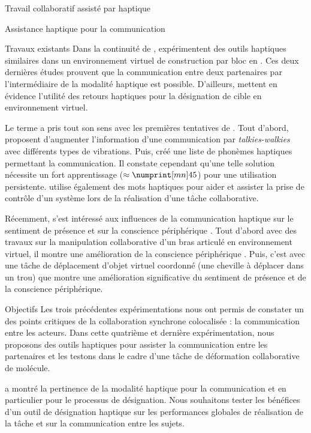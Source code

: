\documentclass[myfrancais,ngerman,english,frenchb]{mythesis}
\begin{document}
\begin{mychapter}{Travail collaboratif assisté par haptique}
\begin{mysection}{Assistance haptique pour la communication}
\begin{mysubsection}{Travaux existants}
				Dans la continuité de ,  expérimentent des outils haptiques similaires dans un environnement virtuel de construction par bloc en \myThreeD.
				Ces deux dernières études prouvent que la communication entre deux partenaires par l'intermédiaire de la modalité haptique est possible.
				D'ailleurs,  mettent en évidence l'utilité des retours haptiques pour la désignation de cible en environnement virtuel.

				Le terme  a pris tout son sens avec les premières tentatives de .
				Tout d'abord,  proposent d'augmenter l'information d'une communication par \textit{talkies-walkies} avec différents types de vibrations.
				Puis,  créé une liste de phonèmes haptiques permettant la communication.
				Il constate cependant qu'une telle solution nécessite un fort apprentissage ($\approx \mynum[mn]{45}$) pour une utilisation persistente.
				 utilise également des mots haptiques pour aider et assister la prise de contrôle d'un système lors de la réalisation d'une tâche collaborative.

				Récemment,  s'est intéressé aux influences de la communication haptique sur le sentiment de présence et sur la conscience périphérique .
				Tout d'abord avec des travaux sur la manipulation collaborative d'un bras articulé en environnement virtuel, il montre une amélioration de la conscience périphérique .
				Puis, c'est avec une tâche de déplacement d'objet virtuel coordonné (une cheville à déplacer dans un trou) que  montre une amélioration significative du sentiment de présence et de la conscience périphérique.
			\end{mysubsection}
			\begin{mysubsection}{Objectifs}
				Les trois précédentes expérimentations nous ont permis de constater un des points critiques de la collaboration synchrone colocalisée : la communication entre les acteurs.
				Dans cette quatrième et dernière expérimentation, nous proposons des outils haptiques pour assister la communication entre les partenaires et les testons dans le cadre d'une tâche de déformation collaborative de molécule.

				 a montré la pertinence de la modalité haptique pour la communication et en particulier pour le processus de désignation.
				Nous souhaitons tester les bénéfices d'un outil de désignation haptique sur les performances globales de réalisation de la tâche et sur la communication entre les sujets.


\end{mysubsection}
\end{mysection}
\end{mychapter}
\end{document}
